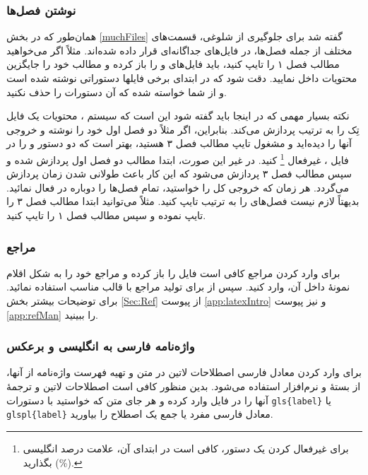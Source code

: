 \subsubsection{نوشتن فصل‌ها}
همان‌طور که در بخش \ref{muchFiles} گفته شد برای جلوگیری از شلوغی، قسمت‌های مختلف \پ از جمله فصل‌ها، در فایل‌های جداگانه‌ای قرار داده شده‌اند. 
مثلاً اگر می‌خواهید مطالب فصل ۱ را تایپ کنید، باید فایل‌های 
و
را باز کرده و مطالب خود را جایگزین محتویات داخل 
نمایید. دقت شود که در ابتدای برخی فایلها دستوراتی نوشته شده است و از شما خواسته شده که آن دستورات را حذف نکنید.


نکته بسیار مهمی که در اینجا باید گفته شود این است که سیستم \lr{\TeX}، محتویات یک فایل تِک را به ترتیب پردازش می‌کند.  بنابراین، اگر مثلاً  دو فصل اول خود را نوشته و خروجی آنها را دیده‌اید و مشغول تایپ مطالب فصل ۳ هستید، بهتر است
که دو دستور 
\verb!!
و
\verb!!
را در فایل 
،
غیرفعال%
\footnote{
برای غیرفعال کردن یک دستور، کافی است در ابتدای آن، علامت درصد انگلیسی (\%) بگذارید.
}
 کنید. در غیر این صورت، ابتدا مطالب دو فصل اول پردازش شده و سپس مطالب فصل ۳ پردازش می‌شود که این کار باعث طولانی شدن زمان پردازش می‌گردد. هر زمان که خروجی کل \پ را خواستید، تمام فصل‌ها را دوباره در
فعال نمائید.
بدیهتاً لازم نیست فصل‌های \پ را به ترتیب تایپ کنید. مثلاً می‌توانید ابتدا مطالب فصل ۳ را تایپ نموده و سپس مطالب فصل ۱ را تایپ کنید. 
\subsubsection{مراجع}
برای وارد کردن مراجع \پ کافی است فایل 
را باز کرده و مراجع خود را به شکل اقلام نمونهٔ داخل آن، وارد کنید.  سپس از  برای تولید مراجع با قالب مناسب استفاده نمائید. برای توضیحات بیشتر بخش \ref{Sec:Ref} از پیوست \ref{app:latexIntro} و نیز پیوست \ref{app:refMan} را ببینید.

\subsubsection{واژه‌نامه فارسی به انگلیسی و برعکس}
برای وارد کردن معادل فارسی اصطلاحات لاتین در متن و تهیه فهرست واژه‌نامه از آنها، از بستهٔ
و نرم‌افزار
استفاده می‌شود. بدین منظور کافی است اصطلاحات لاتین و ترجمهٔ آنها را در فایل
وارد کرده و هر جای متن که خواستید با دستورات
\verb|gls{label}|
یا \verb|glspl{label}|
معادل فارسی مفرد یا جمع یک اصطلاح را بیاورید.

